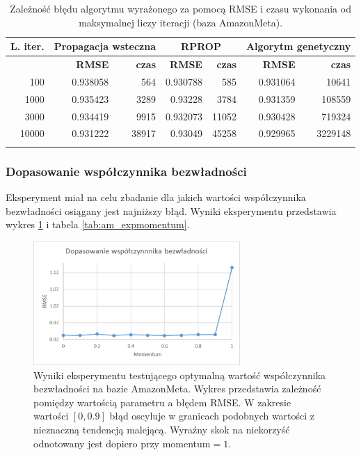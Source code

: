 \documentclass[twoside]{iisthesis}
\begin{document}
			\begin{longtable}[H]{r||rr|rr|rr}		
				\label{tab:am_expiterations}		
				\textbf{L. iter.} & \multicolumn{2}{c|}{\textbf{Propagacja wsteczna}}  & \multicolumn{2}{c|}{\textbf{RPROP}} & \multicolumn{2}{c}{\textbf{Algorytm genetyczny}}  \\
				\hline
				& \textbf{RMSE} & \textbf{czas} & \textbf{RMSE} & \textbf{czas} & \textbf{RMSE} & \textbf{czas} \\
				\hline
				100   & 0.938058 & 564   & 0.930788 & 585   & 0.931064 & 10641   \\
				1000  & 0.935423 & 3289  & 0.93228  & 3784  & 0.931359 & 108559  \\
				3000  & 0.934419 & 9915  & 0.932073 & 11052 & 0.930428 & 719324  \\
				10000 & 0.931222 & 38917 & 0.93049  & 45258 & 0.929965 & 3229148 \\
				\caption{Zależność błędu algorytmu wyrażonego za pomocą RMSE i czasu wykonania od maksymalnej liczy iteracji (baza AmazonMeta).}
			\end{longtable}
			
			\subsubsection{Dopasowanie współczynnika bezwładności} 
			
			Eksperyment miał na celu zbadanie dla jakich wartości współczynnika bezwładności osiągany jest najniższy błąd. Wyniki eksperymentu przedstawia wykres \ref{fig:am_expmomentum} i tabela \ref{tab:am_expmomentum}. 
			
			\begin{figure}[H]
				\centering
				\includegraphics[width=0.7\textwidth]{am_expmomentum}			
				\caption{Wyniki eksperymentu testującego optymalną wartość współczynnika bezwładności na bazie AmazonMeta. Wykres przedstawia zależność pomiędzy wartością parametru a błędem RMSE. W zakresie wartości $[0,0.9]$ błąd oscyluje w granicach podobnych wartości z nieznaczną tendencją malejącą. Wyraźny skok na niekorzyść odnotowany jest dopiero przy momentum$=1$.}
				\label{fig:am_expmomentum}
			\end{figure}
			
\end{document}
